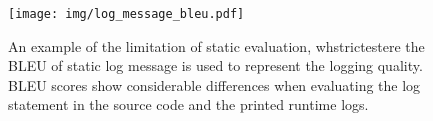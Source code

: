     \begin{figure}[t]
    \centering
    \texttt{[image: img/log\_message\_bleu.pdf]}
    \caption{An example of the limitation of static evaluation, whstrictestere the BLEU of static log message is used to represent the logging quality. BLEU scores show considerable differences when evaluating the log statement in the source code and the printed runtime logs.}
    \label{fig:bleu}
    \end{figure}